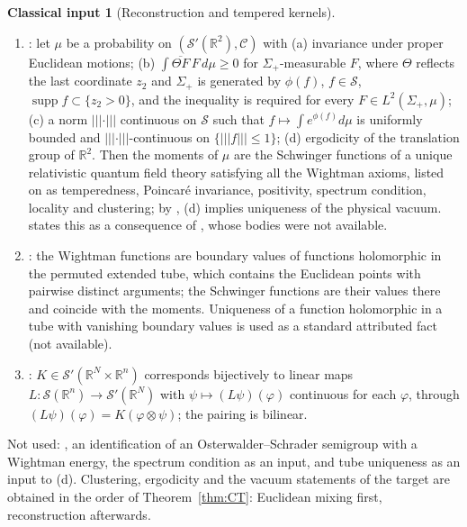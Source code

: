 \documentclass[11pt]{article}
\theoremstyle{plain}
\theoremstyle{definition}
\newtheorem{classical}{Classical input}
\theoremstyle{remark}
\newcommand{\R}{\mathbb{R}}
\newcommand{\cC}{\mathcal{C}}
\newcommand{\cS}{\mathcal{S}}
\newcommand{\conj}[1]{\overline{#1}}
\DeclareMathOperator{\supp}{supp}
\begin{document}
\begin{classical}[Reconstruction and tempered kernels]\label{prem:C3}
\begin{enumerate}[label=(\roman*)]
\item \cite[Thm.~1.0, first assertion, and conditions (a)--(d), p.~495]{FS1977}:
  let $\mu$ be a probability on $(\cS'(\R^{2}),\cC)$ with (a) invariance under
  proper Euclidean motions; (b) $\int\conj{\Theta F}\,F\,d\mu\ge0$ for
  $\Sigma_+$-measurable $F$, where $\Theta$ reflects the last coordinate $z_2$ and
  $\Sigma_+$ is generated by $\phi(f)$, $f\in\cS$, $\supp f\subset\{z_2>0\}$,
  and the inequality is required for every $F\in L^2(\Sigma_+,\mu)$; (c) a
  norm $|||\cdot|||$ continuous on $\cS$ such that $f\mapsto\int e^{\phi(f)}d\mu$ is
  uniformly bounded and $|||\cdot|||$-continuous on $\{|||f|||\le1\}$; (d)
  ergodicity of the translation group of $\R^{2}$. Then the moments of $\mu$ are
  the Schwinger functions of a unique relativistic quantum field theory
  satisfying all the Wightman axioms, listed on \cite[p.~494]{FS1977} as
  temperedness, Poincar\'e invariance, positivity, spectrum condition, locality
  and clustering; by \cite[p.~495, Remark~2]{FS1977}, (d) implies uniqueness of
  the physical vacuum. \cite{FS1977} states this as a consequence of
  \cite{OS1973,OS1975}, whose bodies were not available.
\item \cite[p.~494]{FS1977}: the Wightman functions are boundary values of
  functions holomorphic in the permuted extended tube, which contains the
  Euclidean points with pairwise distinct arguments; the Schwinger functions are
  their values there and coincide with the moments. Uniqueness of a function
  holomorphic in a tube with vanishing boundary values is used as a standard
  attributed fact \cite{StreaterWightman1964} (not available).
\item \cite[Lecture~15, p.~2, Thm.~1]{Melrose2016Lecture15}: $K\in\cS'(\R^{N}\times\R^{n})$
  corresponds bijectively to linear maps $L:\cS(\R^{n})\to\cS'(\R^{N})$ with
  $\psi\mapsto(L\psi)(\varphi)$ continuous for each $\varphi$, through
  $(L\psi)(\varphi)=K(\varphi\otimes\psi)$; the pairing is bilinear.
\end{enumerate}
Not used: \cite[Thm.~4.4]{FS1977}, an identification of an
Osterwalder--Schrader semigroup with a Wightman energy, the spectrum condition as
an input, and tube uniqueness as an input to (d). Clustering, ergodicity and
the vacuum statements of the target are obtained in the order of
Theorem~\ref{thm:CT}: Euclidean mixing first, reconstruction afterwards.
\end{classical}
\end{document}
